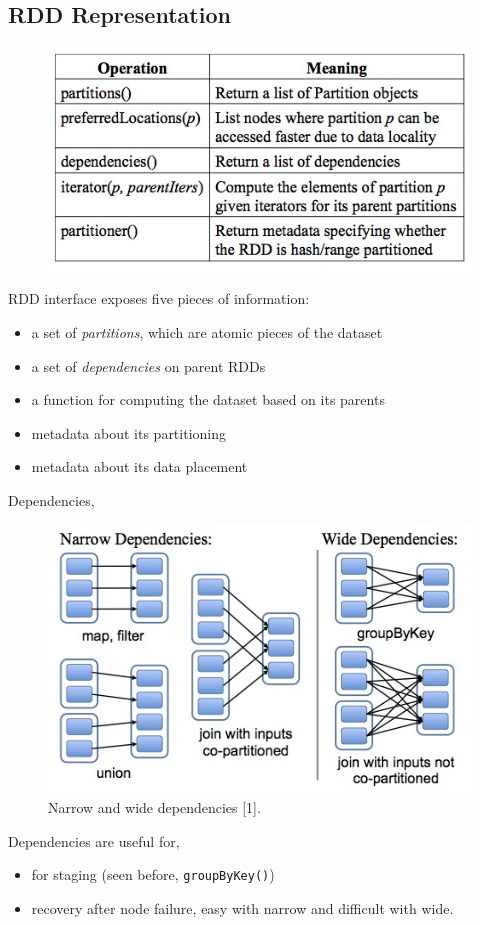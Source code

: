 \subsection{RDD Representation}
\begin{frame}
\begin{figure}
\centering
\includegraphics[width=0.55\linewidth]{figures/rdd-representation.jpg}
\end{figure}
RDD interface exposes five pieces of information:
\begin{itemize}
  \item a set of \textit{partitions}, which are atomic pieces of the dataset 
  \item a set of \textit{dependencies} on parent RDDs
  \item a function for computing the dataset based on its parents
  \item metadata about its partitioning
  \item metadata about its data placement
\end{itemize}
\end{frame}

\begin{frame}
Dependencies,
\begin{figure}
\centering
\includegraphics[width=0.45\linewidth]{figures/rdd-dependies.jpg}
\caption{Narrow and wide dependencies [1].}
\end{figure}
Dependencies are useful for,
\begin{itemize}
  \item for staging (seen before, \texttt{groupByKey()})
  \item recovery after node failure, easy with narrow and difficult with wide.
\end{itemize}
\end{frame}

